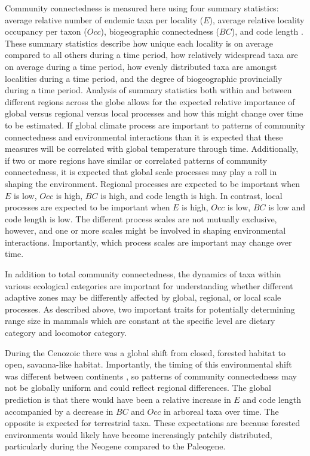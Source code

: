 \documentclass[12pt,letterpaper]{article}
\begin{document}
Community connectedness is measured here using four summary statistics: average relative number of endemic taxa per locality (\(E\)), average relative locality occupancy per taxon (\(Occ\)), biogeographic connectedness (\(BC\)), and code length \citep{Sidor2013}. These summary statistics describe how unique each locality is on average compared to all others during a time period, how relatively widespread taxa are on average during a time period, how evenly distributed taxa are amongst localities during a time period, and the degree of biogeographic provincially during a time period. Analysis of summary statistics both within and between different regions across the globe allows for the expected relative importance of global versus regional versus local processes and how this might change over time to be estimated. If global climate process are important to patterns of community connectedness and environmental interactions than it is expected that these measures will be correlated with global temperature through time. Additionally, if two or more regions have similar or correlated patterns of community connectedness, it is expected that global scale processes may play a roll in shaping the environment. Regional processes are expected to be important when \(E\) is low, \(Occ\) is high, \(BC\) is high, and code length is high. In contrast, local processes are expected to be important when \(E\) is high, \(Occ\) is low, \(BC\) is low and code length is low. The different process scales are not mutually exclusive, however, and one or more scales might be involved in shaping environmental interactions. Importantly, which process scales are important may change over time.

In addition to total community connectedness, the dynamics of taxa within various ecological categories are important for understanding whether different adaptive zones may be differently affected by global, regional, or local scale processes. As described above, two important traits for potentially determining range size in mammals which are constant at the specific level are dietary category and locomotor category. 

During the Cenozoic there was a global shift from closed, forested habitat to open, savanna-like habitat. Importantly, the timing of this environmental shift was different between continents \citep{Stromberg2005,Stromberg2013}, so patterns of community connectedness may not be globally uniform and could reflect regional differences. The global prediction is that there would have been a relative increase in \(E\) and code length accompanied by a decrease in \(BC\) and \(Occ\) in arboreal taxa over time. The opposite is expected for terrestrial taxa. These expectations are because forested environments would likely have become increasingly patchily distributed, particularly during the Neogene compared to the Paleogene.
\end{document}
